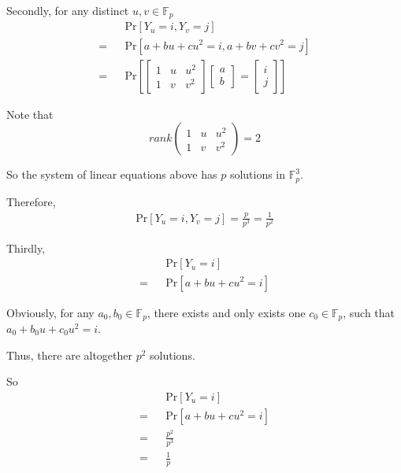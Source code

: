 \documentclass[12pt,a4]{article}
\newcounter{exercise}
\begin{document}
\begin{exercise}
\begin{enumerate}
			Secondly, for any distinct $u, v \in \mathbb{F}_{p}$
			\begin{eqnarray*}
				&&\text{Pr}[Y_u = i, Y_v = j] \\
				= &&\text{Pr}[a + bu + cu^2 = i, a + bv + cv^2 = j] \\
				= &&\text{Pr}[
				\left[
				\begin{matrix}
					1 & u & u^2 \\
					1 & v & v^2
				\end{matrix}
				\right]
				\left[
				\begin{matrix}
					a \\
					b
				\end{matrix}
				\right]
				=
				\left[
				\begin{matrix}
					i \\
					j
				\end{matrix}
				\right]
				]
			\end{eqnarray*}
			
			Note that
			\[
				rank
				\left(
				\begin{matrix}
					1 & u & u^2 \\
					1 & v & v^2
				\end{matrix}
				\right) = 2
			\]
			
			So the system of linear equations above has $p$ solutions in $\mathbb{F}^{3}_{p}$.
			
			Therefore,
			\begin{eqnarray*}
				\text{Pr}[Y_u = i, Y_v = j]
				= \frac{p}{p^3}
				= \frac{1}{p^2}
			\end{eqnarray*}
			
			Thirdly,
			\begin{eqnarray*}
				&&\text{Pr}[Y_u = i] \\
				= &&\text{Pr}[a + bu + cu^2 = i]
			\end{eqnarray*}
			
			Obviously, for any $a_0, b_0 \in \mathbb{F}_{p}$, there exists and only exists one $c_0 \in \mathbb{F}_{p}$, such that $a_0 + b_0 u + c_0 u^2 = i$.
			
			Thus, there are altogether $p^2$ solutions.
			
			So
			\begin{eqnarray*}
				&&\text{Pr}[Y_u = i] \\
				= &&\text{Pr}[a + bu + cu^2 = i] \\
				= &&\frac{p^2}{p^3} \\
				= &&\frac{1}{p}
			\end{eqnarray*}
			

\end{enumerate}
\end{exercise}
\end{document}
